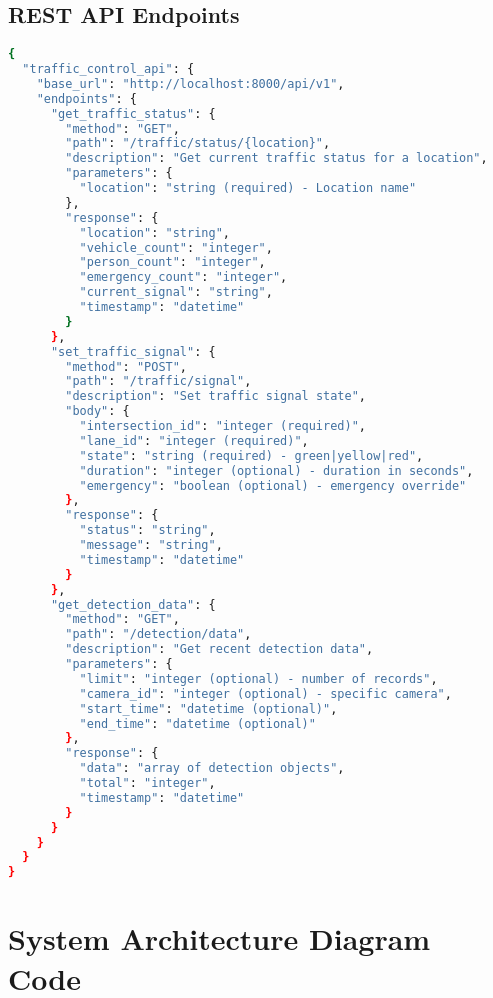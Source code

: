 \subsection{REST API Endpoints}

\begin{lstlisting}[language=bash, caption=API Endpoint Documentation]
{
  "traffic_control_api": {
    "base_url": "http://localhost:8000/api/v1",
    "endpoints": {
      "get_traffic_status": {
        "method": "GET",
        "path": "/traffic/status/{location}",
        "description": "Get current traffic status for a location",
        "parameters": {
          "location": "string (required) - Location name"
        },
        "response": {
          "location": "string",
          "vehicle_count": "integer",
          "person_count": "integer",
          "emergency_count": "integer",
          "current_signal": "string",
          "timestamp": "datetime"
        }
      },
      "set_traffic_signal": {
        "method": "POST",
        "path": "/traffic/signal",
        "description": "Set traffic signal state",
        "body": {
          "intersection_id": "integer (required)",
          "lane_id": "integer (required)",
          "state": "string (required) - green|yellow|red",
          "duration": "integer (optional) - duration in seconds",
          "emergency": "boolean (optional) - emergency override"
        },
        "response": {
          "status": "string",
          "message": "string",
          "timestamp": "datetime"
        }
      },
      "get_detection_data": {
        "method": "GET",
        "path": "/detection/data",
        "description": "Get recent detection data",
        "parameters": {
          "limit": "integer (optional) - number of records",
          "camera_id": "integer (optional) - specific camera",
          "start_time": "datetime (optional)",
          "end_time": "datetime (optional)"
        },
        "response": {
          "data": "array of detection objects",
          "total": "integer",
          "timestamp": "datetime"
        }
      }
    }
  }
}
\end{lstlisting}

\section{System Architecture Diagram Code}
\label{app:architecture_code}

